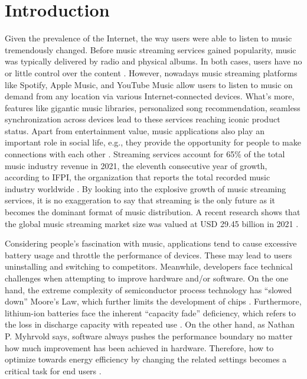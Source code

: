\section{Introduction}
Given the prevalence of the Internet, the way users were able to listen to music tremendously changed. Before music streaming services gained popularity, music was typically delivered by radio and physical albums. In both cases, users have no or little control over the content \cite{hiller2017rise}. However, nowadays music streaming platforms like Spotify, Apple Music, and YouTube Music allow users to listen to music on demand from any location via various Internet-connected devices. What’s more, features like gigantic music libraries, personalized song recommendation, seamless synchronization across devices lead to these services reaching iconic product status. Apart from entertainment value, music applications also play an important role in social life{\color{blue}, e.g., they provide the opportunity for people to make connections with each other \cite{oyedele2018streaming}. Streaming services account for 65\% of the total music industry revenue in 2021, the eleventh consecutive year of growth, according to IFPI, the organization that reports the total recorded music industry worldwide \cite{3}.} 
By looking into the explosive growth of music streaming services, it is no exaggeration to say that streaming is the only future as it becomes the dominant format of music distribution. A recent research shows that the global music streaming market size was valued at USD 29.45 billion in 2021 \cite{4}.

Considering people’s fascination with music, applications tend to cause excessive battery usage and throttle the performance of devices. These may lead to users uninstalling and switching to competitors. Meanwhile, developers face technical challenges when attempting to improve hardware and/or software. On the one hand, the extreme complexity of semiconductor process technology has “slowed down” Moore’s Law, which further limits the development of chips \cite{waldrop2016chips}. Furthermore, lithium-ion batteries face the inherent “capacity fade” deficiency, which refers to the loss in discharge capacity with repeated use \cite{spotnitz2003simulation}. On the other hand, as Nathan P. Myhrvold says, software always pushes the performance boundary no matter how much improvement has been achieved in hardware. Therefore, how to optimize towards energy efficiency by changing the related settings becomes a critical task for end users {\color{blue}\cite{romaine1999invisible}}. 

